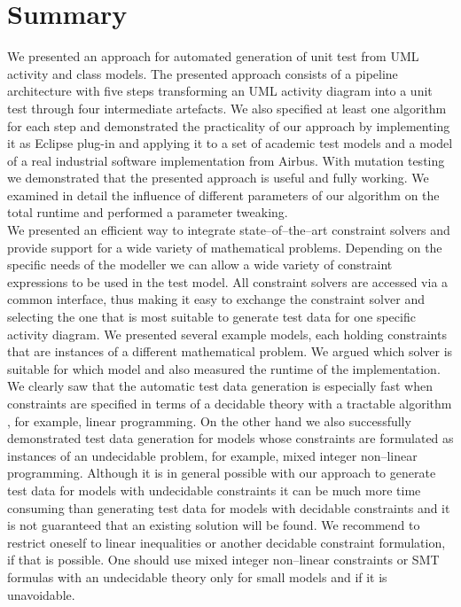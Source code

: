 \section{Summary}
We presented an approach for automated generation of unit test from UML activity and class models. The presented approach consists of a pipeline architecture with five steps transforming an UML activity diagram into a unit test through four intermediate artefacts. We also specified at least one algorithm for each step and demonstrated the practicality of our approach by implementing it as Eclipse plug-in and applying it to a set of academic test models and a model of a real industrial software implementation from Airbus. With mutation testing we demonstrated that the presented approach is useful and fully working. We examined in detail the influence of different parameters of our algorithm on the total runtime and performed a parameter tweaking.\\
We presented an efficient way to integrate state--of--the--art constraint solvers and provide support for a wide variety of mathematical problems. Depending on the specific needs of the modeller we can allow a wide variety of constraint expressions to be used in the test model. All constraint solvers are accessed via a common interface, thus making it easy to exchange the constraint solver and selecting the one that is most suitable to generate test data for one specific activity diagram. We presented several example models, each holding constraints that are instances of a different mathematical problem. We argued which solver is suitable for which model and also measured the runtime of the implementation. We clearly saw that the automatic test data generation is especially fast when constraints are specified in terms of a decidable theory with a tractable algorithm , for example, linear programming. On the other hand we also successfully demonstrated test data generation for models whose constraints are formulated as instances of an undecidable problem, for example, mixed integer non--linear programming. Although it is in general possible with our approach to generate test data for models with undecidable constraints it can be much more time consuming than generating test data for models with decidable constraints and it is not guaranteed that an existing solution will be found. We recommend to restrict oneself to linear inequalities or another decidable constraint formulation, if that is possible. One should use mixed integer non--linear constraints or SMT formulas with an undecidable theory only for small models and if it is unavoidable.\\
